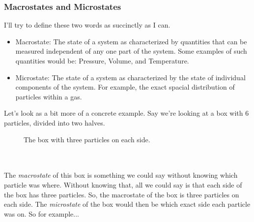 \subsubsection{Macrostates and Microstates}
I'll try to define these two words as succinctly as I can.
\begin{itemize}
    \item Macrostate: The state of a system as characterized by quantities that can be measured independent of any one part of the system. Some examples of such quantities would be: Pressure, Volume, and Temperature.
    \item Microstate: The state of a system as characterized by the state of individual components of the system. For example, the exact spacial distribution of particles within a gas.
\end{itemize}
Let's look as a bit more of a concrete example. Say we're looking at a box with 6 particles, divided into two halves.

\begin{figure}[ht!]
    \centering
{}
    \caption{The box with three particles on each side.}
\end{figure}
\phantom{i} \\
\phantom{i} \\
The \textit{macrostate} of this box is something we could say without knowing which particle was where. Without knowing that, all we could say is that each side of the box has three particles. So, the macrostate of the box is three particles on each side. The \textit{microstate} of the box would then be which exact side each particle was on. So for example...

